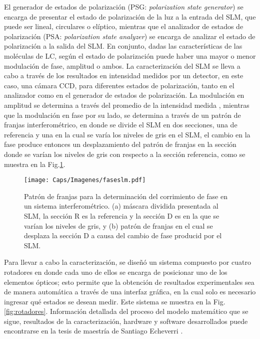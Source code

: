 El generador de estados de polarización (PSG: \textit{polarization state generator}) se encarga de presentar el estado de polarización de la luz a la entrada del SLM, que puede ser lineal, circulares o elíptico, mientras que el analizador de estados de polarización (PSA: \textit{polarization state analyzer}) se encarga de analizar el estado de polarización a la salida del SLM. En conjunto, dadas las características de las moléculas de LC, según el estado de polarización puede haber una mayor o menor modulación de fase, amplitud o ambos. La caracterización del SLM se lleva a cabo a través de los resultados en intensidad medidos por un detector, en este caso, una cámara CCD, para diferentes estados de polarización, tanto en el analizador como en el generador de estados de polarización. La modulación en amplitud se determina a través del promedio de la intensidad medida \cite{Moreno2003, Ma2011}, mientras que la modulación en fase por su lado, se determina a través de un patrón de franjas interferométrico, en donde se divide el SLM en dos secciones, una de referencia y una en la cual se varía los niveles de gris en el SLM, el cambio en la fase produce entonces un desplazamiento del patrón de franjas en la sección donde se varían los niveles de gris con respecto a la sección referencia, como se muestra en la Fig.\ref{fig:faseslm}. \\

\begin{figure}[!ht]
  \centering
    \texttt{[image: Caps/Imagenes/faseslm.pdf]}
  \caption[Patrón de franjas para la determinación del corrimiento de fase en un sistema interferométrico.]{Patrón de franjas para la determinación del corrimiento de fase en un sistema interferométrico. (a) máscara dividida presentada al SLM, la sección R es la referencia y la sección D es en la que se varían los niveles de gris, y (b) patrón de franjas en el cual se desplaza la sección D a causa del cambio de fase producid por el SLM.}
  \label{fig:faseslm}
\end{figure}

Para llevar a cabo la caracterización, se diseñó un sistema compuesto por cuatro rotadores en donde cada uno de ellos se encarga de posicionar uno de los elementos ópticos; esto permite que la obtención de resultados experimentales sea de manera automática a través de una interfaz gráfica, en la cual solo es necesario ingresar qué estados se desean medir. Este sistema se muestra en la Fig. \ref{fig:rotadores}. Información detallada del proceso del modelo matemático que se sigue, resultados de la caracterización, hardware y software desarrollados puede encontrarse en la tesis de maestría de Santiago Echeverri \cite{EcheverriChacon2015}.

